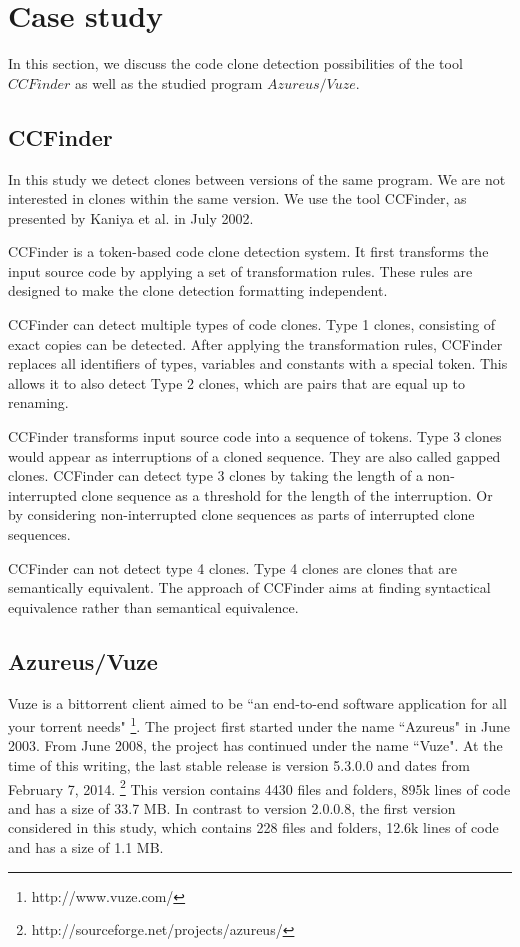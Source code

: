 \documentclass[a4paper,twoside, twocolumn, 11pt]{article}
\numberwithin{equation}{section}
\begin{document}
\section{Case study}
In this section, we discuss the code clone detection possibilities of the tool $CCFinder$ as well as the studied program $Azureus/Vuze$.

\subsection{CCFinder}
In this study we detect clones between versions of the same program.
We are not interested in clones within the same version.
We use the tool CCFinder, as presented by Kaniya et al. in July 2002.

CCFinder is a token-based code clone detection system. \cite{CCFinder}
It first transforms the input source code by applying a set of transformation rules.
These rules are designed to make the clone detection formatting independent.  

CCFinder can detect multiple types of code clones.
Type 1 clones, consisting of exact copies can be detected. 
After applying the transformation rules, CCFinder replaces all identifiers of types, variables and constants with a special token.
This allows it to also detect Type 2 clones, which are pairs that are equal up to renaming.

CCFinder transforms input source code into a sequence of tokens.
Type 3 clones would appear as interruptions of a cloned sequence. They are also called gapped clones.
CCFinder can detect type 3 clones by taking the length of a non-interrupted clone sequence as a threshold for the length of the interruption.
Or by considering non-interrupted clone sequences as parts of interrupted clone sequences.

CCFinder can not detect type 4 clones.
Type 4 clones are clones that are semantically equivalent. 
The approach of CCFinder aims at finding syntactical equivalence rather than semantical equivalence.

\subsection{Azureus/Vuze}
Vuze is a bittorrent client aimed to be ``an end-to-end software application for all your torrent needs" \footnote{http://www.vuze.com/}.
The project first started under the name ``Azureus" in June 2003.
From June 2008, the project has continued under the name ``Vuze".
At the time of this writing, the last stable release is version 5.3.0.0 and dates from February 7, 2014. \footnote{http://sourceforge.net/projects/azureus/}
This version contains 4430 files and folders, 895k lines of code and has a size of 33.7 MB. 
In contrast to version 2.0.0.8, the first version considered in this study, which contains 228 files and folders, 12.6k lines of code and has a size of 1.1 MB.
\end{document}
